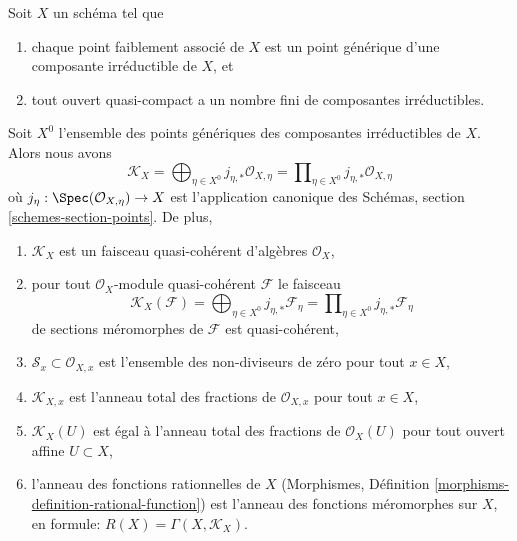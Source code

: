 \begin{lemma}
\label{lemma-meromorphic-weakass-finite}
Soit  $X$  un schéma tel que
\begin{enumerate}
\item[(a)] chaque point faiblement associé de  $X$  est un point générique d'une
composante irréductible de  $X$, et
\item[(b)] tout ouvert quasi-compact a un nombre fini de composantes irréductibles.
\end{enumerate}
Soit  $X^0$  l'ensemble des points génériques des composantes irréductibles
de  $X$. Alors nous avons
$$
\mathcal{K}_X =
\bigoplus\nolimits_{\eta \in X^0} j_{\eta, *}\mathcal{O}_{X, \eta} =
\prod\nolimits_{\eta \in X^0} j_{\eta, *}\mathcal{O}_{X, \eta}
$$
où  $j_\eta : \Spec(\mathcal{O}_{X, \eta}) \to X$  est l'application canonique des Schémas, section  \ref{schemes-section-points}. De
plus,
\begin{enumerate}
\item $\mathcal{K}_X$  est un faisceau quasi-cohérent d'algèbres  $\mathcal{O}_X$,
\item pour tout  $\mathcal{O}_X$-module quasi-cohérent  $\mathcal{F}$  le faisceau
$$
\mathcal{K}_X(\mathcal{F}) =
\bigoplus\nolimits_{\eta \in X^0} j_{\eta, *}\mathcal{F}_\eta =
\prod\nolimits_{\eta \in X^0} j_{\eta, *}\mathcal{F}_\eta
$$
de sections méromorphes de  $\mathcal{F}$  est quasi-cohérent,
\item $\mathcal{S}_x \subset \mathcal{O}_{X, x}$  est l'ensemble des non-diviseurs de zéro pour tout  $x \in X$,
\item $\mathcal{K}_{X, x}$  est l'anneau total des fractions de  $\mathcal{O}_{X, x}$  pour tout
 $x \in X$,
\item $\mathcal{K}_X(U)$  est égal à l'anneau total des fractions de  $\mathcal{O}_X(U)$  pour tout
ouvert affine  $U \subset X$,
\item l'anneau des fonctions rationnelles de  $X$  (Morphismes, Définition
 \ref{morphisms-definition-rational-function}) est l'anneau des fonctions méromorphes sur  $X$, en formule:
 $R(X) = \Gamma(X, \mathcal{K}_X)$.
\end{enumerate}
\end{lemma}

